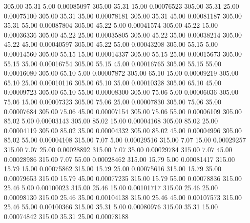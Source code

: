     305.00     35.31      5.00     0.00085097
    305.00     35.31     15.00     0.00076523
    305.00     35.31     25.00     0.00075100
    305.00     35.31     35.00     0.00078181
    305.00     35.31     45.00     0.00081187
    305.00     35.31     55.00     0.00087804
    305.00     45.22      5.00     0.00041574
    305.00     45.22     15.00     0.00036336
    305.00     45.22     25.00     0.00035805
    305.00     45.22     35.00     0.00038214
    305.00     45.22     45.00     0.00040597
    305.00     45.22     55.00     0.00043208
    305.00     55.15      5.00     0.00014560
    305.00     55.15     15.00     0.00014337
    305.00     55.15     25.00     0.00015673
    305.00     55.15     35.00     0.00016754
    305.00     55.15     45.00     0.00016765
    305.00     55.15     55.00     0.00016080
    305.00     65.10      5.00     0.00007872
    305.00     65.10     15.00     0.00009219
    305.00     65.10     25.00     0.00010116
    305.00     65.10     35.00     0.00010328
    305.00     65.10     45.00     0.00009723
    305.00     65.10     55.00     0.00008300
    305.00     75.06      5.00     0.00006036
    305.00     75.06     15.00     0.00007323
    305.00     75.06     25.00     0.00007830
    305.00     75.06     35.00     0.00007684
    305.00     75.06     45.00     0.00007154
    305.00     75.06     55.00     0.00006109
    305.00     85.02      5.00     0.00003143
    305.00     85.02     15.00     0.00004168
    305.00     85.02     25.00     0.00004119
    305.00     85.02     35.00     0.00004332
    305.00     85.02     45.00     0.00004996
    305.00     85.02     55.00     0.00004108
    315.00      7.07      5.00     0.00029516
    315.00      7.07     15.00     0.00029257
    315.00      7.07     25.00     0.00028892
    315.00      7.07     35.00     0.00029784
    315.00      7.07     45.00     0.00028986
    315.00      7.07     55.00     0.00028462
    315.00     15.79      5.00     0.00081417
    315.00     15.79     15.00     0.00075862
    315.00     15.79     25.00     0.00075616
    315.00     15.79     35.00     0.00079653
    315.00     15.79     45.00     0.00077235
    315.00     15.79     55.00     0.00078836
    315.00     25.46      5.00     0.00100023
    315.00     25.46     15.00     0.00101717
    315.00     25.46     25.00     0.00098130
    315.00     25.46     35.00     0.00104138
    315.00     25.46     45.00     0.00107573
    315.00     25.46     55.00     0.00100366
    315.00     35.31      5.00     0.00080976
    315.00     35.31     15.00     0.00074842
    315.00     35.31     25.00     0.00078188
